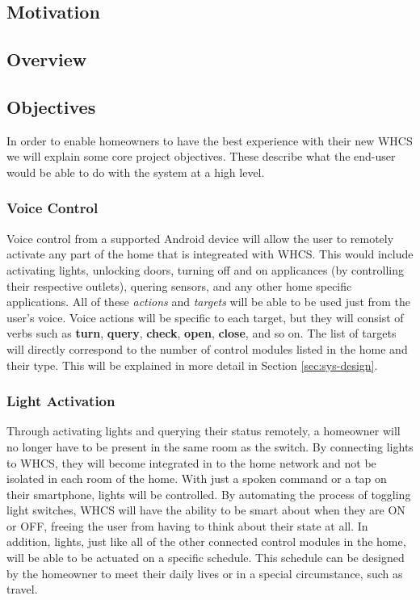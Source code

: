
\subsection{Motivation}


\subsection{Overview}


\subsection{Objectives}
In order to enable homeowners to have the best experience with their new WHCS
we will explain some core project objectives. These describe what the end-user
would be able to do with the system at a high level.

\subsubsection{Voice Control}
Voice control
from a supported Android device will allow the user to remotely activate any
part of the home that is integreated with WHCS. This would include activating
lights, unlocking doors, turning off and on applicances (by controlling their
respective outlets), quering sensors, and any other home specific applications.
All of these \emph{actions} and \emph{targets} will be able to be used just
from the user's voice. Voice actions will be specific to each target, but they
will consist of verbs such as \textbf{turn}, \textbf{query}, \textbf{check},
\textbf{open}, \textbf{close}, and so on. The list of targets will directly
correspond to the number of control modules listed in the home and their type.
This will be explained in more detail in Section \ref{sec:sys-design}.

\subsubsection{Light Activation}
Through activating lights and querying their status remotely, a homeowner will
no longer have to be present in the same room as the switch.  By connecting
lights to WHCS, they will become integrated in to the home network and not be
isolated in each room of the home.  With just a spoken command or a tap on
their smartphone, lights will be controlled.  By automating the process of
toggling light switches, WHCS will have the ability to be smart about when they
are ON or OFF, freeing the user from having to think about their state at all.
In addition, lights, just like all of the other connected control modules in
the home, will be able to be actuated on a specific schedule. This schedule
 can be designed by the homeowner
to meet their daily lives or in a special circumstance, such as travel.

